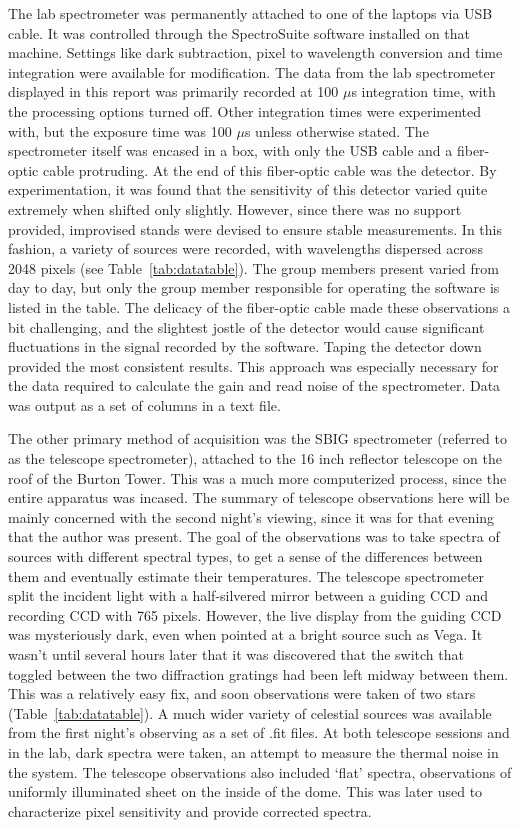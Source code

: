 \documentclass[a4paper,12pt]{article}
\begin{document}
The lab spectrometer was permanently attached to one of the laptops via USB cable. It was controlled through the SpectroSuite software installed on that machine. Settings like dark subtraction, pixel to wavelength conversion and time integration were available for modification. The data from the lab spectrometer displayed in this report was primarily recorded at 100 $\mu$s integration time, with the processing options turned off. Other integration times were experimented with, but the exposure time was 100 $\mu$s unless otherwise stated. The spectrometer itself was encased in a box, with only the USB cable and a fiber-optic cable protruding. At the end of this fiber-optic cable was the detector. By experimentation, it was found that the sensitivity of this detector varied quite extremely when shifted only slightly. However, since there was no support provided, improvised stands were devised to ensure stable measurements. In this fashion, a variety of sources were recorded, with wavelengths dispersed across 2048 pixels (see Table~\ref{tab:datatable}). The group members present varied from day to day, but only the group member responsible for operating the software is listed in the table. The delicacy of the fiber-optic cable made these observations a bit challenging, and the slightest jostle of the detector would cause significant fluctuations in the signal recorded by the software. Taping the detector down provided the most consistent results. This approach was especially necessary for the data required to calculate the gain and read noise of the spectrometer. Data was output as a set of columns in a text file.

The other primary method of acquisition was the SBIG spectrometer (referred to as the telescope spectrometer), attached to the 16 inch reflector telescope on the roof of the Burton Tower. This was a much more computerized process, since the entire apparatus was incased. The summary of telescope observations here will be mainly concerned with the second night’s viewing, since it was for that evening that the author was present. The goal of the observations was to take spectra of sources with different spectral types, to get a sense of the differences between them and eventually estimate their temperatures. The telescope spectrometer split the incident light with a half-silvered mirror between a guiding CCD and recording CCD with 765 pixels. However, the live display from the guiding CCD was mysteriously dark, even when pointed at a bright source such as Vega. It wasn’t until several hours later that it was discovered that the switch that toggled between the two diffraction gratings had been left midway between them. This was a relatively easy fix, and soon observations were taken of two stars (Table~\ref{tab:datatable}). A much wider variety of celestial sources was available from the first night's observing as a set of .fit files. At both telescope sessions and in the lab, dark spectra were taken, an attempt to measure the thermal noise in the system. The telescope observations also included ‘flat’ spectra, observations of uniformly illuminated sheet on the inside of the dome. This was later used to characterize pixel sensitivity and provide corrected spectra.
\end{document}
